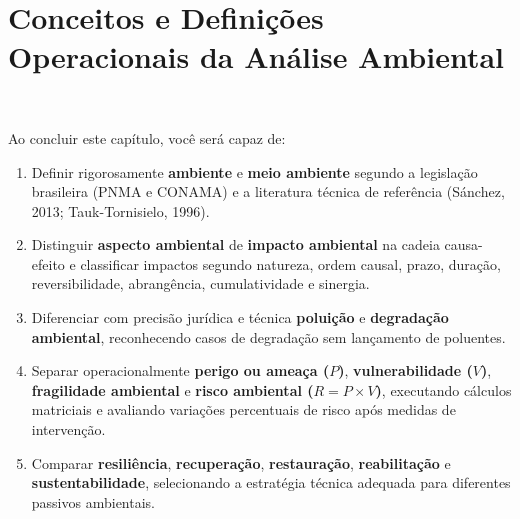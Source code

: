 
\chapter[Conceitos Operacionais da Análise Ambiental]{Conceitos e Definições Operacionais da Análise Ambiental}
\label{cap:conceitos-operacionais}

\noindent\tagEmenta\ 

\vspace{4pt}

\begin{capObjetivos}
Ao concluir este capítulo, você será capaz de:
\begin{enumerate}[leftmargin=1.6em, itemsep=2.5pt]
  \item Definir rigorosamente \textbf{ambiente} e \textbf{meio ambiente} segundo a legislação brasileira (PNMA e CONAMA) e a literatura técnica de referência (Sánchez, 2013; Tauk-Tornisielo, 1996).
  \item Distinguir \textbf{aspecto ambiental} de \textbf{impacto ambiental} na cadeia causa-efeito e classificar impactos segundo natureza, ordem causal, prazo, duração, reversibilidade, abrangência, cumulatividade e sinergia.
  \item Diferenciar com precisão jurídica e técnica \textbf{poluição} e \textbf{degradação ambiental}, reconhecendo casos de degradação sem lançamento de poluentes.
  \item Separar operacionalmente \textbf{perigo ou ameaça ($P$)}, \textbf{vulnerabilidade ($V$)}, \textbf{fragilidade ambiental} e \textbf{risco ambiental ($R = P \times V$)}, executando cálculos matriciais e avaliando variações percentuais de risco após medidas de intervenção.
  \item Comparar \textbf{resiliência}, \textbf{recuperação}, \textbf{restauração}, \textbf{reabilitação} e \textbf{sustentabilidade}, selecionando a estratégia técnica adequada para diferentes passivos ambientais.
\end{enumerate}
\end{capObjetivos}

